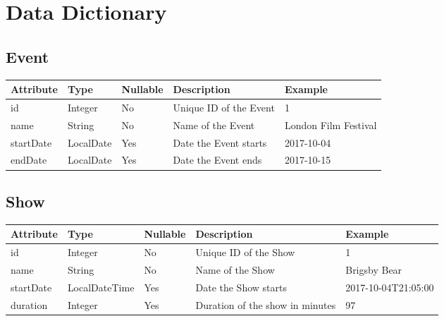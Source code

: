 
\chapter{Data Dictionary}

\section{Event}

\keepXColumns
\begin{tabularx}{\textwidth}{l l l X l}
  \textbf{Attribute}  & \textbf{Type} & \textbf{Nullable} & \textbf{Description}    & \textbf{Example} \\
  \endhead
  id                  & Integer       & No                & Unique ID of the Event  & 1\\
  name                & String        & No                & Name of the Event       & London Film Festival\\
  startDate           & LocalDate     & Yes               & Date the Event starts   & 2017-10-04\\
  endDate             & LocalDate     & Yes               & Date the Event ends     & 2017-10-15\\
\end{tabularx}

\section{Show}

\keepXColumns
\begin{tabularx}{\textwidth}{l l l X l}
  \textbf{Attribute}  & \textbf{Type} & \textbf{Nullable} & \textbf{Description}            & \textbf{Example} \\
  \endhead
  id                  & Integer       & No                & Unique ID of the Show           & 1\\
  name                & String        & No                & Name of the Show                & Brigsby Bear\\
  startDate           & LocalDateTime & Yes               & Date the Show starts            & 2017-10-04T21:05:00\\
  duration            & Integer       & Yes               & Duration of the show in minutes & 97\\
\end{tabularx}

